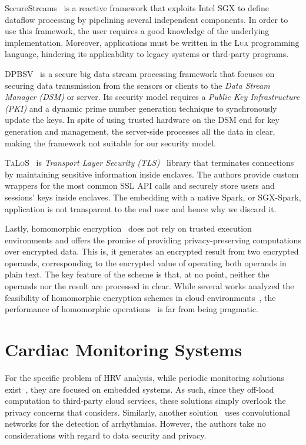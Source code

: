 SecureStreams~\cite{Havet2017} is a reactive framework that exploits Intel SGX to define dataflow processing by pipelining several independent components. 
In order to use this framework, the user requires a good knowledge of the underlying implementation. 
Moreover, applications must be written in the \textsc{Lua} programming language, hindering its applicability to legacy systems or thrd-party programs.

\textsc{DPBSV}~\cite{Puthal2015} is a secure big data stream processing framework that focuses on securing data transmission from the sensors or clients to the \textit{Data Stream Manager (DSM)} or server. 
Its security model requires a \textit{Public Key Infrastructure (PKI)} and a dynamic prime number generation technique to synchronously update the keys. 
In spite of using trusted hardware on the DSM end for key generation and management, the server-side processes all the data in clear, making the framework not suitable for our security model. 

\textsc{TaLoS}~\cite{Aublin2017} is \textit{Transport Layer Security (TLS)}~\cite{Dierks2008} library that terminates connections by maintaining sensitive information inside enclaves. 
The authors provide custom wrappers for the most common \textsc{SSL} API calls and securely store users and sessions' keys inside enclaves.
The embedding with a native Spark, or SGX-Spark, application is not transparent to the end user and hence why we discard it.

Lastly, homomorphic encryption~\cite{Gentry2009} does not rely on trusted execution environments and offers the promise of providing privacy-preserving computations over encrypted data.
This is, it generates an encrypted result from two encrypted operands, corresponding to the encrypted value of operating both operands in plain text.
The key feature of the scheme is that, at no point, neither the operands nor the result are processed in clear.
While several works analyzed the feasibility of homomorphic encryption schemes in cloud environments~\cite{Tetali2013,Stephen2016}, the performance of homomorphic operations~\cite{Gottel2018} is far from being pragmatic.

\section{Cardiac Monitoring Systems} \label{sec:related:cardiac}
For the specific problem of HRV analysis, while periodic monitoring solutions exist~\cite{Renevey2018}, they are focused on embedded systems.
As such, since they off-load computation to third-party cloud services, these solutions simply overlook the privacy concerns that \projName considers.
Similarly, another solution~\cite{VanZaen2019} uses convolutional networks for the detection of arrhythmias.
However, the authors take no considerations with regard to data security and privacy.

